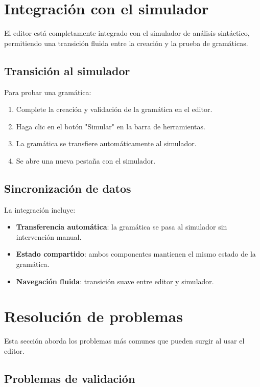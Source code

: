 \section{Integración con el simulador}

El editor está completamente integrado con el simulador de análisis sintáctico, permitiendo una transición fluida entre la creación y la prueba de gramáticas.

\subsection{Transición al simulador}

Para probar una gramática:

\begin{enumerate}
    \item Complete la creación y validación de la gramática en el editor.
    \item Haga clic en el botón \string"Simular\string" en la barra de herramientas.
    \item La gramática se transfiere automáticamente al simulador.
    \item Se abre una nueva pestaña con el simulador.
\end{enumerate}

\subsection{Sincronización de datos}

La integración incluye:

\begin{itemize}
    \item \textbf{Transferencia automática}: la gramática se pasa al simulador sin intervención manual.
    \item \textbf{Estado compartido}: ambos componentes mantienen el mismo estado de la gramática.
    \item \textbf{Navegación fluida}: transición suave entre editor y simulador.
\end{itemize}

\section{Resolución de problemas}

Esta sección aborda los problemas más comunes que pueden surgir al usar el editor.

\subsection{Problemas de validación}

